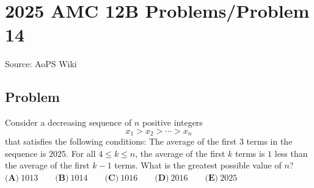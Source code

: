\documentclass[12pt]{article}
\begin{document}
\section*{{2025 AMC 12B Problems/Problem 14}}
Source: AoPS Wiki

\subsection*{Problem}
Consider a decreasing sequence of \(n\) positive integers \[x_1 > x_2 > \cdots > x_n\] that satisfies the following conditions: The average of the first \(3\) terms in the sequence is \(2025\). For all \(4 \le k \le n\), the average of the first \(k\) terms is \(1\) less than the average of the first \(k-1\) terms. What is the greatest possible value of \(n\)? $\textbf{(A)}~1013 \qquad \textbf{(B)}~1014 \qquad \textbf{(C)}~1016 \qquad \textbf{(D)}~2016 \qquad \textbf{(E)}~2025$
\end{document}
